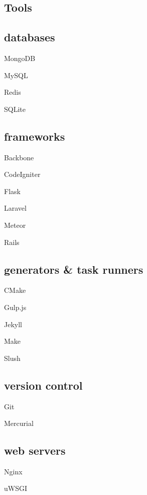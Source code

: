 \documentclass{article}
\def\emcolor{blue!25!black}
\newcommand{\fgem}{\color{\emcolor}}%
\newenvironment{aside}{%
\noindent
\begin{minipage}[t]{\dimexpr0.25\textwidth}%
\let\oldsection\section
\let\oldsubsection\subsection
\renewcommand{\section}[1]{\oldsection*{\fgem ##1}}
\renewcommand{\subsection}[1]{\oldsubsection*{\small ##1}\vspace{-0.5em}}
\begin{center}%
}{%
\end{center}%
\let\subsection\oldsubsection
\let\section\oldsection
\end{minipage}%
}
\begin{document}
\begin{aside}
\section{Tools}
\center
\subsection{databases}
\begin{itemize*}
\item{MongoDB}
\item{MySQL}
\item{Redis}
\item{SQLite}
\end{itemize*}

\subsection{frameworks}
\begin{itemize*}
\item{Backbone}
\item{CodeIgniter}
\item{Flask}
\item{Laravel}
\item{Meteor}
\item{Rails}
\end{itemize*}

\subsection{generators \& task runners}
\begin{itemize*}
\item{CMake}
\item{Gulp.js}
\item{Jekyll}
\item{Make}
\item{Slush}
\end{itemize*}

\subsection{version control}
\begin{itemize*}
\item{Git}
\item{Mercurial}
\end{itemize*}

\subsection{web servers}
\begin{itemize*}
\item{Nginx}
\item{uWSGI}
\end{itemize*}


\end{aside}
\end{document}
